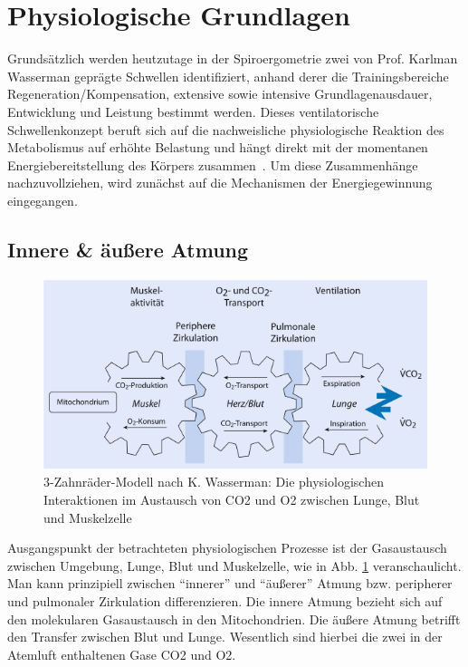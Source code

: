 \section{Physiologische Grundlagen}
%
Grundsätzlich werden heutzutage in der Spiroergometrie zwei von Prof. Karlman Wasserman geprägte Schwellen identifiziert, anhand derer die Trainingsbereiche Regeneration/Kompensation, extensive sowie intensive Grundlagenausdauer, Entwicklung und Leistung bestimmt werden. Dieses ventilatorische Schwellenkonzept beruft sich auf die nachweisliche physiologische Reaktion des Metabolismus auf erhöhte Belastung und hängt direkt mit der momentanen Energiebereitstellung des Körpers zusammen~\cite{Westhoff.2012}. Um diese Zusammenhänge nachzuvollziehen, wird zunächst auf die Mechanismen der Energiegewinnung eingegangen.
%
\subsection{Innere \& äußere Atmung}
%
\begin{figure}[H]
	\centering
	\includegraphics[scale=0.65]{Bilder/zahnraeder.png}
	\caption[3-Zahnräder-Modell mit physiologischen Interaktionen im Gasaustausch]{3-Zahnräder-Modell nach K. Wasserman: Die physiologischen Interaktionen im Austausch von \gls{CO2} und \gls{O2} zwischen Lunge, Blut und Muskelzelle~\cite{Loellgen.2010}}
	\label{pic:pic1}
\end{figure}
%
Ausgangspunkt der betrachteten physiologischen Prozesse ist der Gasaustausch zwischen Umgebung, Lunge, Blut und Muskelzelle, wie in Abb. \ref{pic:pic1} veranschaulicht. Man kann prinzipiell zwischen "`innerer"' und "`äußerer"' Atmung bzw. peripherer und pulmonaler Zirkulation differenzieren. Die innere Atmung bezieht sich auf den molekularen Gasaustausch in den Mitochondrien. Die äußere Atmung betrifft den Transfer zwischen Blut und Lunge. Wesentlich sind hierbei die zwei in der Atemluft enthaltenen Gase \gls{CO2} und \gls{O2}.
